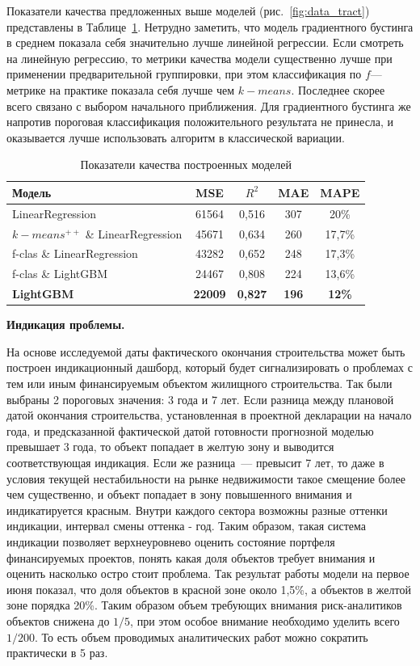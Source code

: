 \documentclass[12pt,a4paper]{article} %
\begin{document}
Показатели качества предложенных выше моделей (рис.~\ref{fig:data_tract}) представлены в Таблице~\ref{Tab:3}. Нетрудно заметить, что модель градиентного бустинга в среднем показала себя значительно лучше линейной регрессии. Если смотреть на линейную регрессию, то метрики качества модели существенно лучше при применении предварительной группировки, при этом классификация по $f$---метрике
на практике показала себя лучше чем $k-means$. Последнее скорее всего связано с выбором начального приближения. Для градиентного бустинга же напротив пороговая классификация положительного результата не принесла, и оказывается лучше использовать алгоритм в классической вариации. 
\begin{table}[h]
	\centering
	\begin{tabular}{lcccc}
		
		\hline  Модель& MSE &  $R^2$ & MAE & MAPE \\
		\hline LinearRegression  & 61564 & 0,516 & 307 & 20\%\\
		$k-means^{++}$ \& LinearRegression  & 45671 & 0,634 & 260& 17,7\%\\
		f-clas \& LinearRegression & 43282 & 0,652 & 248 & 17,3\%\\
		f-clas \& LightGBM & 24467 &  0,808 & 224 & 13,6\%\\
		\hline
		\textbf{LightGBM}&  \textbf{22009}& \textbf{0,827}& \textbf{196}&
		\textbf{12\%}   \\
		\hline 
	\end{tabular}
	
	\caption{Показатели качества построенных моделей}
	\label{Tab:3}
\end{table}

\textbf{Индикация проблемы.} 

На основе исследуемой даты фактического окончания строительства может быть построен индикационный дашборд, который будет сигнализировать о проблемах с тем или иным финансируемым объектом жилищного строительства. 
Так были выбраны 2 пороговых значения: $3$ года и $7$ лет. Если разница между плановой датой окончания строительства, установленная в проектной декларации на начало года, и предсказанной фактической датой готовности прогнозной моделью превышает 3 года, то объект попадает в желтую зону и выводится соответствующая индикация. Если же разница~--- превысит 7 лет, то даже в условия текущей нестабильности на рынке недвижимости такое смещение более чем существенно, и объект попадает в зону повышенного внимания и индикатируется красным. Внутри каждого сектора возможны разные оттенки индикации, интервал смены оттенка - год.
Таким образом, такая система индикации позволяет верхнеуровнево оценить состояние портфеля финансируемых проектов, понять какая доля объектов требует внимания и оценить насколько остро стоит проблема. Так результат работы модели на первое июня показал, что доля объектов в красной зоне около 1,5\%, а объектов в желтой зоне порядка 20\%. Таким образом объем требующих внимания риск-аналитиков объектов снижена до $1/5$, при этом особое внимание необходимо уделить всего $1/200$. То есть объем проводимых аналитических работ можно сократить практически в 5 раз.
\end{document}
